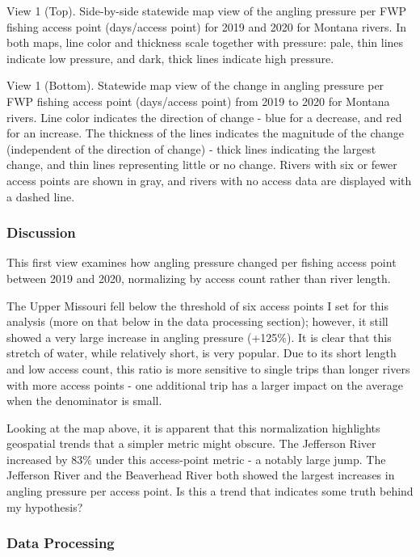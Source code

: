 \documentclass[11pt]{article}
\begin{document}
    View 1 (Top). Side-by-side statewide map view of the angling pressure
per FWP fishing access point (days/access point) for 2019 and 2020 for
Montana rivers. In both maps, line color and thickness scale together
with pressure: pale, thin lines indicate low pressure, and dark, thick
lines indicate high pressure.

View 1 (Bottom). Statewide map view of the change in angling pressure
per FWP fishing access point (days/access point) from 2019 to 2020 for
Montana rivers. Line color indicates the direction of change - blue for
a decrease, and red for an increase. The thickness of the lines
indicates the magnitude of the change (independent of the direction of
change) - thick lines indicating the largest change, and thin lines
representing little or no change. Rivers with six or fewer access points
are shown in gray, and rivers with no access data are displayed with a
dashed line.

    \hypertarget{discussion}{%
\subsubsection{Discussion}\label{discussion}}

This first view examines how angling pressure changed per fishing access
point between 2019 and 2020, normalizing by access count rather than
river length.

The Upper Missouri fell below the threshold of six access points I set
for this analysis (more on that below in the data processing section);
however, it still showed a very large increase in angling pressure
(+125\%). It is clear that this stretch of water, while relatively
short, is very popular. Due to its short length and low access count,
this ratio is more sensitive to single trips than longer rivers with
more access points - one additional trip has a larger impact on the
average when the denominator is small.

Looking at the map above, it is apparent that this normalization
highlights geospatial trends that a simpler metric might obscure. The
Jefferson River increased by 83\% under this access-point metric - a
notably large jump. The Jefferson River and the Beaverhead River both
showed the largest increases in angling pressure per access point. Is
this a trend that indicates some truth behind my hypothesis?

    \hypertarget{data-processing}{%
\subsubsection{Data Processing}\label{data-processing}}
\end{document}
